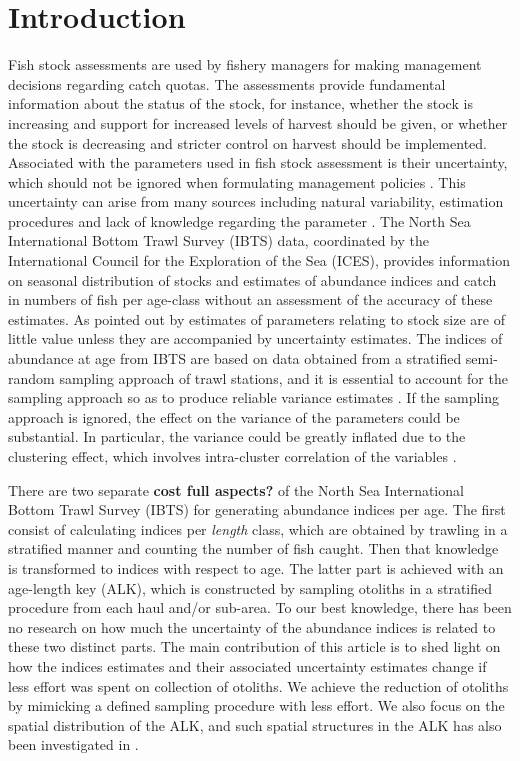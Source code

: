 \documentclass[a4paper 12pt]{article}
\numberwithin{equation}{section}
\begin{document}
\section{Introduction}
Fish stock assessments are used by fishery managers for making management decisions regarding catch quotas. The assessments provide fundamental information about the status of the stock, for instance, whether the stock is increasing and support for increased levels of harvest should be given, or whether the stock is decreasing and stricter control on harvest should be implemented. Associated with the parameters used in fish stock assessment is their uncertainty, which should not be ignored when formulating management policies \citep{walters1981effects, ludwig1981measurement}. This uncertainty can arise from many sources including natural variability, estimation procedures and lack of knowledge regarding the parameter \citep{ehrhardt1997role}. The North Sea International Bottom Trawl Survey (IBTS) data, coordinated by the International Council for the Exploration of the Sea (ICES), provides information on seasonal distribution of stocks and estimates of abundance indices and catch in numbers of fish per age-class without an assessment of the accuracy of these estimates.  As pointed out by  \citet{ludwig1981measurement} estimates of parameters relating to stock size are of little value unless they are accompanied by uncertainty estimates. The indices of abundance at age from IBTS  are based on data obtained from a stratified semi-random sampling approach of trawl stations,  and  it is essential to account for the sampling approach so as to produce reliable variance estimates \citep{lehtonen2004practical}. If the sampling approach is ignored, the effect on the variance  of the parameters could be substantial.  In particular, the variance could be greatly inflated  due to the clustering effect, which involves intra-cluster correlation of the variables \citep{aanes2015efficient, lehtonen2004practical}. 

There are two separate {\bf cost full aspects?} of the North Sea International Bottom Trawl Survey (IBTS) for generating abundance indices per age.  The first consist of calculating indices per \textit{length} class, which are obtained by trawling in a stratified manner and counting the number of fish caught. Then that knowledge is transformed to indices with respect to age. The latter part is achieved with an age-length key (ALK), which is constructed by sampling otoliths in a stratified procedure from each haul and/or sub-area. To our best knowledge, there has been no research on how much the uncertainty of the abundance indices is related to these two distinct parts. The main contribution of this article is to shed light on how the indices estimates and their associated uncertainty estimates change if less effort was spent on collection of otoliths. We achieve the reduction of otoliths by mimicking a defined sampling procedure with less effort. We also focus on the spatial distribution of the ALK, and such spatial structures in the ALK has also been investigated in \citet{berg2012spatial, hirst2012bayesian}.
\end{document}
